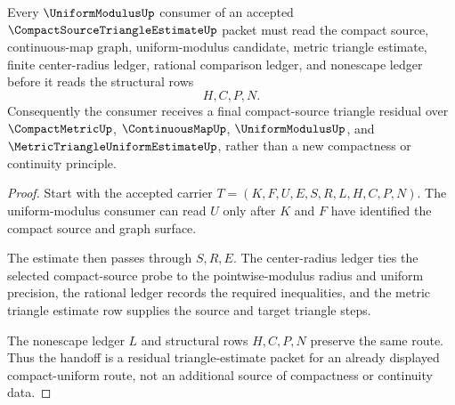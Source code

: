 \begin{theorem}
\label{thm:compact-source-triangle-estimate-uniformmodulus-handoff}
Every $\UniformModulusUp$ consumer of an accepted $\CompactSourceTriangleEstimateUp$ packet must read the compact source, continuous-map graph, uniform-modulus candidate, metric triangle estimate, finite center-radius ledger, rational comparison ledger, and nonescape ledger before it reads the structural rows
$$
H,C,P,N .
$$
Consequently the consumer receives a final compact-source triangle residual over $\CompactMetricUp$, $\ContinuousMapUp$, $\UniformModulusUp$, and $\MetricTriangleUniformEstimateUp$, rather than a new compactness or continuity principle.
\end{theorem}
\begin{proof}
Start with the accepted carrier $T=(K,F,U,E,S,R,L,H,C,P,N)$. The uniform-modulus consumer can read $U$ only after $K$ and $F$ have identified the compact source and graph surface.

The estimate then passes through $S,R,E$. The center-radius ledger ties the selected compact-source probe to the pointwise-modulus radius and uniform precision, the rational ledger records the required inequalities, and the metric triangle estimate row supplies the source and target triangle steps.

The nonescape ledger $L$ and structural rows $H,C,P,N$ preserve the same route. Thus the handoff is a residual triangle-estimate packet for an already displayed compact-uniform route, not an additional source of compactness or continuity data.
\end{proof}




